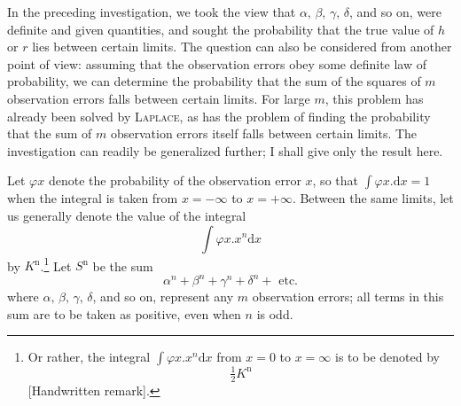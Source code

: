 In the preceding investigation, we took the view that \(\alpha,\,\beta,\,\gamma,\,\delta\), and so on, were definite and given quantities, and sought the probability that the true value of \(h\) or \(r\) lies between certain limits. The question can also be considered from another point of view: assuming that the observation errors obey some definite law of probability, we can determine the probability that the sum of the squares of \(m\) observation errors falls between certain limits. For large \(m\), this problem has already been solved by \textsc{Laplace}, as has the problem of finding the probability that the sum of \(m\) observation errors itself falls between certain limits. The investigation can readily be generalized further; I shall give only the result here.

Let \(\varphi x\) denote the probability of the observation error \(x\), so that \(\int\varphi x.\mathrm{d}x=1\) when the integral is taken from \(x=-\infty\) to \(x=+\infty\). Between the same limits, let us generally denote the value of the integral
\[
\int\varphi x.x^n\mathrm{d}x
\]
by \(K^{\mathrm n}\).\footnote{Or rather, the integral \(\int\varphi x.x^n\mathrm{d}x\) from \(x=0\) to \(x=\infty\) is to be denoted by
\[\tfrac12K^{\mathrm n}\]
[Handwritten remark].} Let \(S^{\mathrm n}\) be the sum
\[
\alpha^n+\beta^n+\gamma^n+\delta^n+\text{ etc.}
\]
where \(\alpha,\,\beta,\,\gamma,\,\delta\), and so on, represent any \(m\) observation errors; all terms in this sum are to be taken as positive, even when \(n\) is odd.

